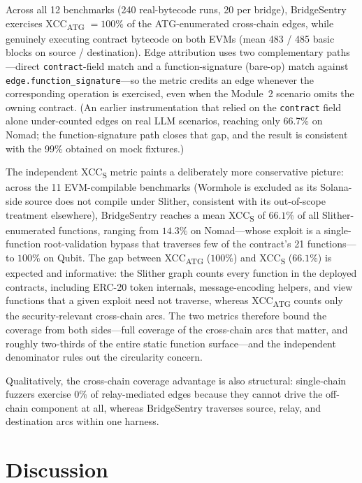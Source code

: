 \documentclass[journal]{IEEEtran}
\begin{document}
\noindent Across all 12 benchmarks (240 real-bytecode runs, 20 per bridge), BridgeSentry exercises XCC\textsubscript{ATG} $= 100\%$ of the ATG-enumerated cross-chain edges, while genuinely executing contract bytecode on both EVMs (mean 483 / 485 basic blocks on source / destination). Edge attribution uses two complementary paths---direct \texttt{contract}-field match and a function-signature (bare-op) match against \texttt{edge.function\_signature}---so the metric credits an edge whenever the corresponding operation is exercised, even when the Module~2 scenario omits the owning contract. (An earlier instrumentation that relied on the \texttt{contract} field alone under-counted edges on real LLM scenarios, reaching only 66.7\% on Nomad; the function-signature path closes that gap, and the result is consistent with the 99\% obtained on mock fixtures.)

The independent XCC\textsubscript{S} metric paints a deliberately more conservative picture: across the 11 EVM-compilable benchmarks (Wormhole is excluded as its Solana-side source does not compile under Slither, consistent with its out-of-scope treatment elsewhere), BridgeSentry reaches a mean XCC\textsubscript{S} of $66.1\%$ of all Slither-enumerated functions, ranging from $14.3\%$ on Nomad---whose exploit is a single-function root-validation bypass that traverses few of the contract's 21 functions---to $100\%$ on Qubit. The gap between XCC\textsubscript{ATG} ($100\%$) and XCC\textsubscript{S} ($66.1\%$) is expected and informative: the Slither graph counts every function in the deployed contracts, including ERC-20 token internals, message-encoding helpers, and view functions that a given exploit need not traverse, whereas XCC\textsubscript{ATG} counts only the security-relevant cross-chain arcs. The two metrics therefore bound the coverage from both sides---full coverage of the cross-chain arcs that matter, and roughly two-thirds of the entire static function surface---and the independent denominator rules out the circularity concern.

Qualitatively, the cross-chain coverage advantage is also structural: single-chain fuzzers exercise 0\% of relay-mediated edges because they cannot drive the off-chain component at all, whereas BridgeSentry traverses source, relay, and destination arcs within one harness.

\section{Discussion}\label{sec:discussion}
\end{document}
